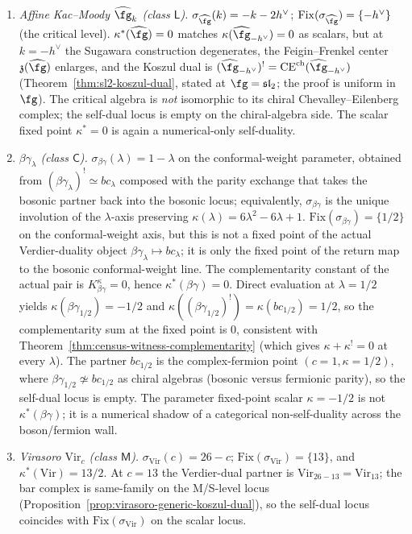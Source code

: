 \begin{theorem}
\begin{enumerate}
\item \emph{Affine Kac--Moody $\widehat{\fg}_k$ (class $\mathsf{L}$).}
 $\sigma_{\widehat{\fg}}(k) = -k - 2h^\vee$;
 $\mathrm{Fix}(\sigma_{\widehat{\fg}}) = \{-h^\vee\}$ (the critical
 level). $\kappa^*(\widehat{\fg}) = 0$ matches
 $\kappa(\widehat{\fg}_{-h^\vee}) = 0$ as scalars, but at $k = -h^\vee$
 the Sugawara construction degenerates, the Feigin--Frenkel center
 $\mathfrak{z}(\widehat{\fg})$ enlarges, and the Koszul dual is
 $(\widehat{\fg}_{-h^\vee})^! = \mathrm{CE}^{\mathrm{ch}}(\widehat{\fg}_{-h^\vee})$
 \textup{(}Theorem~\ref{thm:sl2-koszul-dual}, stated at $\fg =
 \mathfrak{sl}_2$; the proof is uniform in $\fg$\textup{)}. The
 critical algebra is \emph{not} isomorphic to its chiral
 Chevalley--Eilenberg complex; the self-dual locus is empty on the
 chiral-algebra side. The scalar fixed point $\kappa^* = 0$ is again
 a numerical-only self-duality.

\item \emph{$\beta\gamma_\lambda$ (class $\mathsf{C}$).}
 $\sigma_{\beta\gamma}(\lambda) = 1 - \lambda$ on the conformal-weight
 parameter, obtained from $(\beta\gamma_\lambda)^! \simeq bc_\lambda$
 composed with the parity exchange that takes the bosonic partner back
into the bosonic locus; equivalently, $\sigma_{\beta\gamma}$ is the
 unique involution of the $\lambda$-axis preserving
 $\kappa(\lambda) = 6\lambda^2 - 6\lambda + 1$.
 $\mathrm{Fix}(\sigma_{\beta\gamma}) = \{1/2\}$ on the
 conformal-weight axis, but this is not a fixed point of the actual
 Verdier-duality object
 $\beta\gamma_\lambda\mapsto bc_\lambda$; it is only the fixed point
 of the return map to the bosonic conformal-weight line. The
 complementarity constant of the actual pair is
 $K^\kappa_{\beta\gamma}=0$, hence
 $\kappa^*(\beta\gamma)=0$. Direct evaluation at $\lambda = 1/2$
 yields
 $\kappa(\beta\gamma_{1/2}) = -1/2$ and
 $\kappa((\beta\gamma_{1/2})^!) = \kappa(bc_{1/2}) = 1/2$, so the
 complementarity sum at the fixed point is $0$, consistent with
 Theorem~\ref{thm:census-witness-complementarity} \textup{(}which
 gives $\kappa + \kappa^! = 0$ at every $\lambda$\textup{)}. The
 partner $bc_{1/2}$ is the complex-fermion point
 $(c=1,\kappa=1/2)$, where
 $\beta\gamma_{1/2} \not\simeq bc_{1/2}$ as chiral algebras (bosonic
 versus fermionic parity), so the self-dual locus is empty. The
 parameter fixed-point scalar $\kappa = -1/2$ is not
 $\kappa^*(\beta\gamma)$; it is a numerical shadow of a categorical
 non-self-duality across the boson/fermion wall.

\item \emph{Virasoro $\mathrm{Vir}_c$ (class $\mathsf{M}$).}
 $\sigma_{\mathrm{Vir}}(c) = 26 - c$;
 $\mathrm{Fix}(\sigma_{\mathrm{Vir}}) = \{13\}$, and
 $\kappa^*(\mathrm{Vir}) = 13/2$. At $c = 13$ the Verdier-dual partner
 is $\mathrm{Vir}_{26-13} = \mathrm{Vir}_{13}$; the bar complex is
 same-family on the M/S-level locus
 \textup{(}Proposition~\ref{prop:virasoro-generic-koszul-dual}\textup{)},
 so the self-dual locus coincides with
 $\mathrm{Fix}(\sigma_{\mathrm{Vir}})$ on the scalar locus.


\end{enumerate}
\end{theorem}
